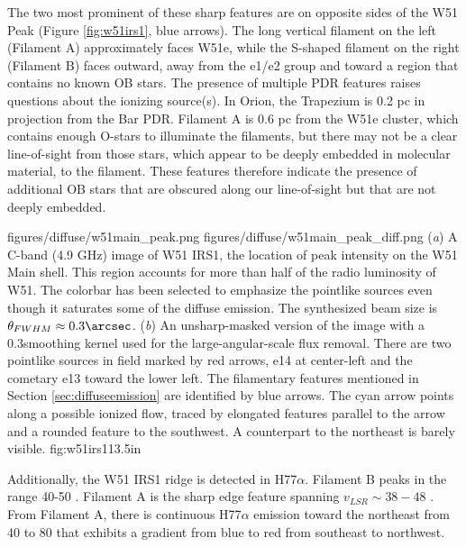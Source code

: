 The two most prominent of these sharp features are on opposite sides of the W51
Peak (Figure \ref{fig:w51irs1}, blue arrows).  The long vertical filament
on the left (Filament A) approximately faces W51e, while the S-shaped filament
on the right (Filament B) faces outward, away from the e1/e2 group and toward a
region that contains no known OB stars.  The presence of multiple PDR features
raises questions about the ionizing source(s).  In Orion, the Trapezium is 0.2
pc in projection from the Bar PDR.  Filament A is 0.6 pc from the W51e cluster,
which contains enough O-stars to illuminate the filaments, but there may not be
a clear line-of-sight from those stars, which appear to be deeply embedded in
molecular material, to the filament.  These features therefore indicate the
presence of additional OB stars that are obscured along our line-of-sight but
that are not deeply embedded.

\FigureTwo
{figures/diffuse/w51main_peak.png}
{figures/diffuse/w51main_peak_diff.png}
{({\it a}) A C-band (4.9 GHz) image of W51 IRS1, the location of peak
intensity on the W51 Main shell.
This region accounts for more than half of the radio luminosity of W51.  The
colorbar has been selected to emphasize the pointlike sources even though it
saturates some of the diffuse emission.  The synthesized beam size
is $\theta_{FWHM}\approx0.3\arcsec$.
({\it b}) An unsharp-masked version of the image with a 0.3\arcsec smoothing
kernel used for the large-angular-scale flux removal. 
There are
two pointlike sources in field marked by red arrows, e14 at center-left and the
cometary e13 toward the lower left.
The filamentary features mentioned in Section \ref{sec:diffuseemission} are
identified by blue arrows.  The cyan arrow points along a possible ionized flow,
traced by elongated features parallel to the arrow and a rounded feature to the
southwest.  A counterpart to the northeast is barely visible.
}
{fig:w51irs1}{1}{3.5in}

Additionally, the W51 IRS1 ridge is detected in H77$\alpha$.  Filament
B peaks in the range 40-50 \kms.  Filament A is the sharp edge feature
spanning $v_{LSR}\sim38-48$ \kms.  From Filament A, there is continuous
H77$\alpha$ emission toward the northeast from 40 to 80 \kms that exhibits a
gradient from blue to red from southeast to northwest.  

